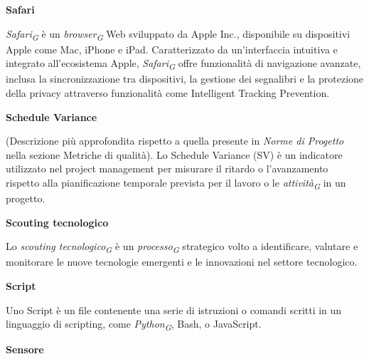 \documentclass{article}
\begin{document}
\textbf{Safari}

\vspace{0.1cm}

\textit{Safari}\textsubscript{\textit{G}} è un \textit{browser}\textsubscript{\textit{G}} Web sviluppato da Apple Inc., disponibile su dispositivi Apple come Mac, iPhone e iPad. Caratterizzato da un'interfaccia intuitiva e integrato all'ecosistema Apple, \textit{Safari}\textsubscript{\textit{G}} offre funzionalità di navigazione avanzate, inclusa la sincronizzazione tra dispositivi, la gestione dei segnalibri e la protezione della privacy attraverso funzionalità come Intelligent Tracking Prevention. 

\vspace{0.4cm}

\textbf{Schedule Variance}

\vspace{0.1cm}

(Descrizione più approfondita rispetto a quella presente in \textit{Norme di Progetto} nella sezione Metriche di qualità). Lo Schedule Variance (SV) è un indicatore utilizzato nel project management per misurare il ritardo o l'avanzamento rispetto alla pianificazione temporale prevista per il lavoro o le \textit{attività}\textsubscript{\textit{G}} in un progetto.

\vspace{0.4cm}

\textbf{Scouting tecnologico}

\vspace{0.1cm}

Lo \textit{scouting tecnologico}\textsubscript{\textit{G}} è un \textit{processo}\textsubscript{\textit{G}} strategico volto a identificare, valutare e monitorare le nuove tecnologie emergenti e le innovazioni nel settore tecnologico.

\vspace{0.4cm}

\textbf{Script}

\vspace{0.1cm}

Uno Script è un file contenente una serie di istruzioni o comandi scritti in un linguaggio di scripting, come \textit{Python}\textsubscript{\textit{G}}, Bash, o JavaScript.

\vspace{0.4cm}

\textbf{Sensore}

\vspace{0.1cm}
\end{document}
